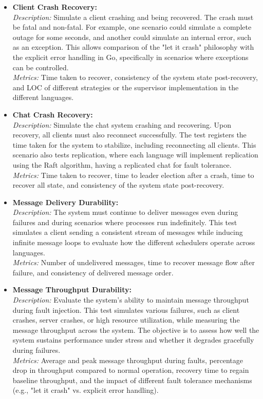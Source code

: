 \begin{itemize}
    \item \textbf{Client Crash Recovery:} \\
    \textit{Description:} Simulate a client crashing and being recovered. The crash must be fatal and non-fatal. For example, one scenario could simulate a complete outage for some seconds, and another could simulate an internal error, such as an exception. This allows comparison of the "let it crash" philosophy with the explicit error handling in Go, specifically in scenarios where exceptions can be controlled. \\
    \textit{Metrics:} Time taken to recover, consistency of the system state post-recovery, and \gls{LOC} of different strategies or the supervisor implementation in the different languages.
    
    \item \textbf{Chat Crash Recovery:} \\
    \textit{Description:} Simulate the chat system crashing and recovering. Upon recovery, all clients must also reconnect successfully. The test registers the time taken for the system to stabilize, including reconnecting all clients. This scenario also tests replication, where each language will implement replication using the Raft algorithm, having a replicated chat for fault tolerance. \\
    \textit{Metrics:} Time taken to recover, time to leader election after a crash, time to recover all state, and consistency of the system state post-recovery.
    
    \item \textbf{Message Delivery Durability:} \\
    \textit{Description:} The system must continue to deliver messages even during failures and during scenarios where processes run indefinitely. This test simulates a client sending a consistent stream of messages while inducing infinite message loops to evaluate how the different schedulers operate across languages. \\
    \textit{Metrics:} Number of undelivered messages, time to recover message flow after failure, and consistency of delivered message order.
    
    \item \textbf{Message Throughput Durability:} \\
    \textit{Description:} Evaluate the system's ability to maintain message throughput during fault injection. This test simulates various failures, such as client crashes, server crashes, or high resource utilization, while measuring the message throughput across the system. The objective is to assess how well the system sustains performance under stress and whether it degrades gracefully during failures. \\
    \textit{Metrics:} Average and peak message throughput during faults, percentage drop in throughput compared to normal operation, recovery time to regain baseline throughput, and the impact of different fault tolerance mechanisms (e.g., "let it crash" vs. explicit error handling).
    

\end{itemize}
